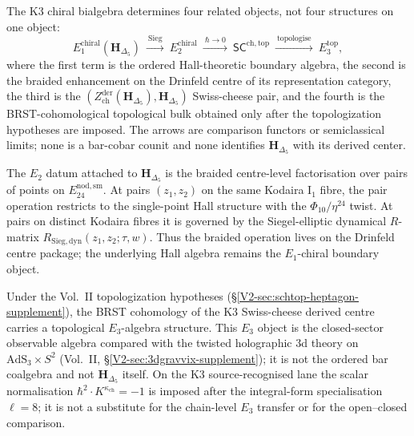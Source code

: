 \begin{remark}
\label{rem:enkd-deep-1}
The K3 chiral bialgebra determines four related objects, not four
structures on one object:
\[
E_1^{\mathrm{chiral}}(\mathbf H_{\Delta_5})\ \xrightarrow{\ \mathrm{Sieg}\ }\ E_2^{\mathrm{chiral}}\ \xrightarrow{\ \hbar\to 0\ }\ \mathsf{SC}^{\mathrm{ch,top}}\ \xrightarrow{\ \mathrm{topologise}\ }\ E_3^{\mathrm{top}},
\]
where the first term is the ordered Hall-theoretic boundary algebra,
the second is the braided enhancement on the Drinfeld centre of its
representation category, the third is the
$(Z^{\mathrm{der}}_{\mathrm{ch}}(\mathbf H_{\Delta_5}),
\mathbf H_{\Delta_5})$ Swiss-cheese pair, and the fourth is the
BRST-cohomological topological bulk obtained only after the
topologization hypotheses are imposed. The arrows are comparison
functors or semiclassical limits; none is a bar-cobar counit and none
identifies $\mathbf H_{\Delta_5}$ with its derived center.
\end{remark}

\begin{remark}
\label{rem:enkd-deep-2}
The $E_2$ datum attached to $\mathbf H_{\Delta_5}$ is the braided
centre-level factorisation over pairs of points on
$E^{\mathrm{nod,sm}}_{24}$. At pairs $(z_1,z_2)$ on the same
Kodaira I$_1$ fibre, the pair operation restricts to the single-point
Hall structure with the $\Phi_{10}/\eta^{24}$ twist. At pairs on
distinct Kodaira fibres it is governed by the Siegel-elliptic
dynamical $R$-matrix $R_{\mathrm{Sieg,dyn}}(z_1,z_2;\tau,w)$. Thus
the braided operation lives on the Drinfeld centre package; the
underlying Hall algebra remains the $E_1$-chiral boundary object.
\end{remark}

\begin{remark}[$E_3^{\mathrm{top}}$ = holographic bulk]
\label{rem:enkd-deep-3}
Under the Vol.~II topologization hypotheses
\textup{(}\S\ref{V2-sec:schtop-heptagon-supplement}\textup{)}, the
BRST cohomology of the K3 Swiss-cheese derived centre carries a
topological $E_3$-algebra structure. This $E_3$ object is the
closed-sector observable algebra compared with the twisted
holographic $3$d theory on
$\mathrm{AdS}_3\times S^2$
\textup{(}Vol.~II, \S\ref{V2-sec:3dgravvix-supplement}\textup{)}; it is
not the ordered bar coalgebra and not $\mathbf H_{\Delta_5}$ itself.
On the K3 source-recognised lane the scalar normalisation
$\hbar^2\cdot K^{\kappa_{\mathrm{ch}}}=-1$ is imposed after the
integral-form specialisation $\ell=8$; it is not a substitute for the
chain-level $E_3$ transfer or for the open--closed comparison.
\end{remark}
